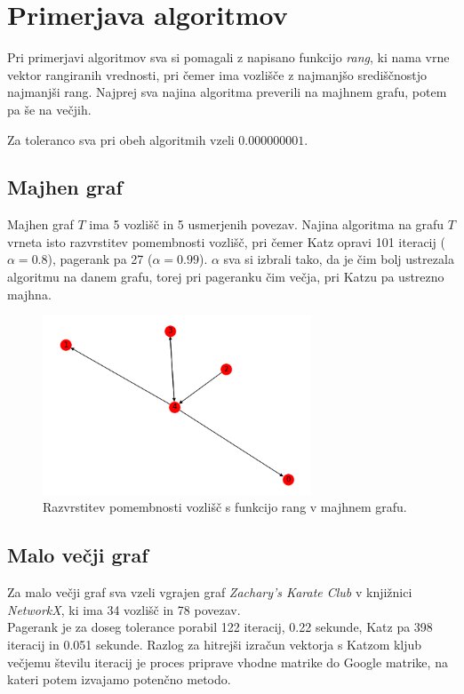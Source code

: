\documentclass[12pt,a4paper]{amsart}
\begin{document}
\section{Primerjava algoritmov}
Pri primerjavi algoritmov sva si pomagali z napisano funkcijo \textit{rang}, ki nama vrne vektor rangiranih vrednosti, pri čemer ima vozlišče z najmanjšo središčnostjo najmanjši rang. Najprej sva najina algoritma preverili na majhnem grafu, potem pa še na večjih. 

Za toleranco sva pri obeh algoritmih vzeli $0.000000001$.

\subsection{Majhen graf}
Majhen graf $T$ ima 5 vozlišč in 5 usmerjenih povezav. Najina algoritma na grafu $T$ vrneta isto razvrstitev pomembnosti vozlišč, pri čemer Katz opravi 101 iteracij ($\alpha = 0.8$), pagerank pa 27 ($\alpha = 0.99$). $\alpha$ sva si izbrali tako, da je čim bolj ustrezala algoritmu na danem grafu, torej pri pageranku čim večja, pri Katzu pa ustrezno majhna.

\begin{figure}[h]
\begin{center} 
\includegraphics[width=8cm]{T_graph.png}
\caption[Razvrstitev pomembnosti vozlišč v majhnem grafu]{Razvrstitev pomembnosti vozlišč s funkcijo rang v majhnem grafu.}
\end{center}
\end{figure}
\subsection{Malo večji graf}
Za malo večji graf sva vzeli vgrajen graf \textit{Zachary's Karate Club} v knjižnici \textit{NetworkX}, ki ima 34 vozlišč in 78 povezav.\\
Pagerank je za doseg tolerance porabil 122 iteracij, 0.22 sekunde, Katz pa 398 iteracij in 0.051 sekunde. Razlog za hitrejši izračun vektorja s Katzom kljub večjemu številu iteracij je proces priprave vhodne matrike do Google matrike, na kateri potem izvajamo potenčno metodo. 
\end{document}

